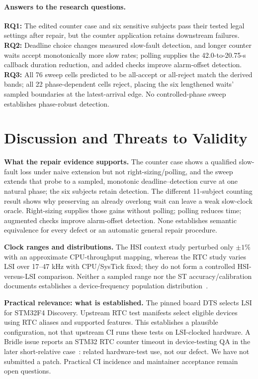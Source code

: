 \documentclass[sigconf,nonacm,balance=false]{acmart}
\begin{document}
\paragraph{Answers to the research questions.}
\textbf{RQ1:} The edited counter case and six sensitive subjects pass their tested legal settings after repair, but the counter application retains downstream failures. \textbf{RQ2:} Deadline choice changes measured slow-fault detection, and longer counter waits accept monotonically more slow rates; polling supplies the 42.0-to-20.75-s callback duration reduction, and added checks improve alarm-offset detection. \textbf{RQ3:} All 76 sweep cells predicted to be all-accept or all-reject match the derived bands; all 22 phase-dependent cells reject, placing the six lengthened waits' sampled boundaries at the latest-arrival edge. No controlled-phase sweep establishes phase-robust detection.

\section{Discussion and Threats to Validity}
\textbf{What the repair evidence supports.} The counter case shows a qualified slow-fault loss under naive extension but not right-sizing/polling, and the sweep extends that probe to a sampled, monotonic deadline--detection curve at one natural phase; the six subjects retain detection. The different 11-subject counting result shows why preserving an already overlong wait can leave a weak slow-clock oracle. Right-sizing supplies those gains without polling; polling reduces time; augmented checks improve alarm-offset detection. None establishes semantic equivalence for every defect or an automatic general repair procedure.

\textbf{Clock ranges and distributions.} The HSI context study perturbed only $\pm1\%$ with an approximate CPU-throughput mapping, whereas the RTC study varies LSI over 17--47 kHz with CPU/SysTick fixed; they do not form a controlled HSI-versus-LSI comparison. Neither a sampled range nor the ST accuracy/calibration documents establishes a device-frequency population distribution~\cite{st_an5067,st_an5126,st_rm0090}.

\textbf{Practical relevance: what is established.} The pinned board DTS selects LSI for STM32F4 Discovery. Upstream RTC test manifests select eligible devices using RTC aliases and supported features. This establishes a plausible configuration, not that upstream CI runs these tests on LSI-clocked hardware. A Bridle issue reports an STM32 RTC counter timeout in device-testing QA in the later short-relative case~\cite{bridle85}: related hardware-test use, not our defect. We have not submitted a patch. Practical CI incidence and maintainer acceptance remain open questions.
\end{document}
